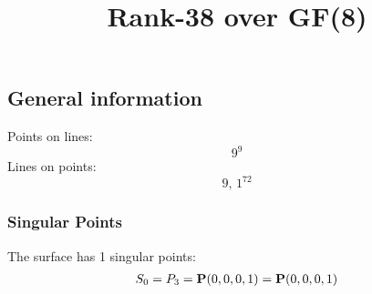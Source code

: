 \documentclass{article}
\newcommand\setTBstruts{\def\T{\rule{0pt}{2.6ex}}%
\def\B{\rule[-1.2ex]{0pt}{0pt}}}
\newcommand{\bP}{{\bf P}}
\begin{document}
 
\setTBstruts



{\allowdisplaybreaks%






\title{Rank-38 over GF(8)}
\author{}%
\maketitle%
%
{}



\subsection*{General information}
Points on lines:
$$
9^9$$
Lines on points:
$$
9,\,1^{72}$$
\subsubsection*{Singular Points}
The surface has 1 singular points:\\
\begin{align*}
S_{0} &= P_{3}=\bP(0, 0, 0, 1) = \bP(0, 0, 0, 1)\\
\end{align*}
}
\end{document}
